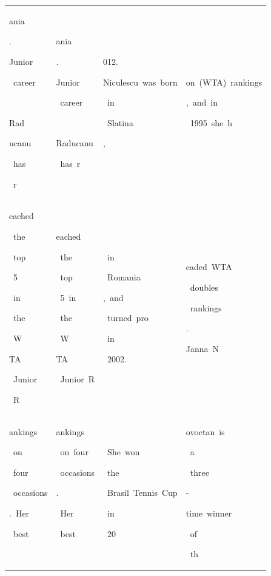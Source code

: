 \begin{table}[h]
\begin{tabular}{ l | l | l | l }
 \colorbox{cm_30!40}{\strut ania}\colorbox{cm_32!40}{\strut .}\colorbox{cm_30!40}{\strut }\colorbox{cm_32!40}{\strut }\colorbox{cm_42!40}{\strut Junior}\colorbox{cm_32!40}{\strut \ career}\colorbox{cm_28!40}{\strut \ }\colorbox{cm_32!40}{\strut }\colorbox{cm_35!40}{\strut Rad}\colorbox{cm_32!40}{\strut ucanu}\colorbox{cm_28!40}{\strut \ has}\colorbox{cm_35!40}{\strut \ r} & \colorbox{cm_12!40}{\strut ania}\colorbox{cm_25!40}{\strut .}\colorbox{cm_38!40}{\strut Junior}\colorbox{cm_51!40}{\strut \ career}\colorbox{cm_25!40}{\strut \ }\colorbox{cm_38!40}{\strut }\colorbox{cm_0!40}{\strut Raducanu}\colorbox{cm_12!40}{\strut \ has\ r} & \colorbox{cm_0!40}{\strut 012.}\colorbox{cm_12!40}{\strut }\colorbox{cm_25!40}{\strut }\colorbox{cm_0!40}{\strut Niculescu\ was\ born}\colorbox{cm_12!40}{\strut \ in}\colorbox{cm_0!40}{\strut \ Slatina}\colorbox{cm_12!40}{\strut ,} & \colorbox{cm_0!40}{\strut on\ (WTA)\ rankings}\colorbox{cm_12!40}{\strut ,\ and\ in}\colorbox{cm_0!40}{\strut \ 1995\ she\ h} \\ 
 \colorbox{cm_35!40}{\strut eached}\colorbox{cm_25!40}{\strut \ the}\colorbox{cm_14!40}{\strut \ top}\colorbox{cm_32!40}{\strut \ 5}\colorbox{cm_35!40}{\strut \ in}\colorbox{cm_29!40}{\strut \ the}\colorbox{cm_25!40}{\strut \ W}\colorbox{cm_32!40}{\strut TA}\colorbox{cm_26!40}{\strut \ Junior}\colorbox{cm_27!40}{\strut \ R} & \colorbox{cm_12!40}{\strut eached}\colorbox{cm_25!40}{\strut \ the}\colorbox{cm_0!40}{\strut \ top}\colorbox{cm_12!40}{\strut \ 5\ in}\colorbox{cm_25!40}{\strut \ the}\colorbox{cm_12!40}{\strut \ W}\colorbox{cm_25!40}{\strut TA}\colorbox{cm_0!40}{\strut \ Junior\ R} & \colorbox{cm_12!40}{\strut \ in}\colorbox{cm_0!40}{\strut \ Romania}\colorbox{cm_12!40}{\strut ,\ and}\colorbox{cm_0!40}{\strut \ turned\ pro}\colorbox{cm_12!40}{\strut \ in}\colorbox{cm_0!40}{\strut \ 2002.} & \colorbox{cm_0!40}{\strut eaded\ WTA}\colorbox{cm_12!40}{\strut \ doubles}\colorbox{cm_0!40}{\strut \ rankings}\colorbox{cm_12!40}{\strut .}\colorbox{cm_25!40}{\strut }\colorbox{cm_38!40}{\strut }\colorbox{cm_0!40}{\strut Janna\ N} \\ 
 \colorbox{cm_27!40}{\strut ankings}\colorbox{cm_38!40}{\strut \ on}\colorbox{cm_27!40}{\strut \ four}\colorbox{cm_32!40}{\strut \ occasions}\colorbox{cm_38!40}{\strut .\ Her}\colorbox{cm_37!40}{\strut \ best}\colorbox{cm_38!40}{\strut \ } & \colorbox{cm_0!40}{\strut ankings}\colorbox{cm_12!40}{\strut \ on\ four}\colorbox{cm_0!40}{\strut \ occasions}\colorbox{cm_12!40}{\strut .}\colorbox{cm_25!40}{\strut \ Her}\colorbox{cm_0!40}{\strut \ best}\colorbox{cm_12!40}{\strut \ } & \colorbox{cm_0!40}{\strut \ She\ won}\colorbox{cm_12!40}{\strut \ the}\colorbox{cm_0!40}{\strut \ Brasil\ Tennis\ Cup}\colorbox{cm_12!40}{\strut \ in}\colorbox{cm_0!40}{\strut \ 20} & \colorbox{cm_0!40}{\strut ovoctan\ is}\colorbox{cm_12!40}{\strut \ a}\colorbox{cm_0!40}{\strut \ three}\colorbox{cm_12!40}{\strut -}\colorbox{cm_0!40}{\strut time\ winner}\colorbox{cm_12!40}{\strut \ of}\colorbox{cm_25!40}{\strut \ th} \\ 

\end{tabular}
\end{table}
